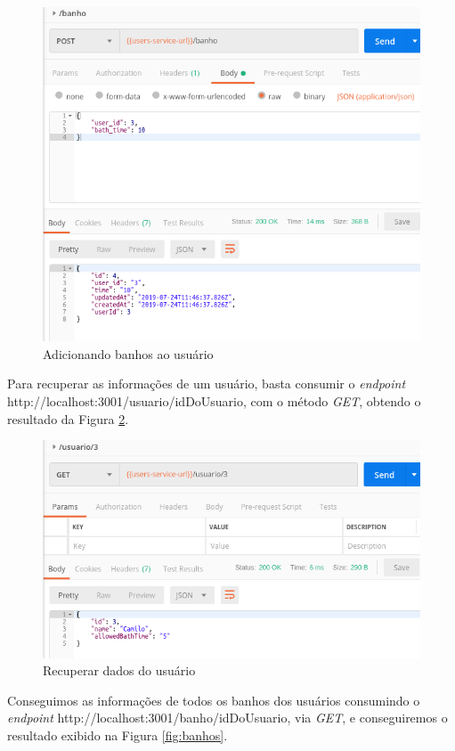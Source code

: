 \begin{figure}[htbp]
	\centering
	\includegraphics[width=0.7\linewidth]{figuras/postman/bathsinclude.png}
	\caption{Adicionando banhos ao usuário}
	\label{fig:banho}
\end{figure}

Para recuperar as informações de um usuário, basta consumir o \textit{endpoint} http://localhost:3001/usuario/idDoUsuario, com o método \textit{GET}, obtendo o resultado da Figura \ref{fig:usuario}.

\begin{figure}[htbp]
	\centering
	\includegraphics[width=0.7\linewidth]{figuras/postman/getuser.png}
	\caption{Recuperar dados do usuário}
	\label{fig:usuario}
\end{figure}

Conseguimos as informações de todos os banhos dos usuários consumindo o \textit{endpoint} http://localhost:3001/banho/idDoUsuario, via \textit{GET}, e conseguiremos o resultado exibido na Figura \ref{fig:banhos}.

